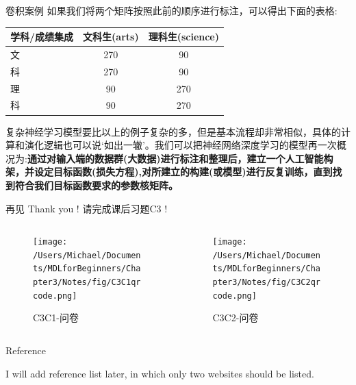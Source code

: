 \documentclass[handout]{beamer}
\begin{document}
\begin{frame}{卷积案例}
如果我们将两个矩阵按照此前的顺序进行标注，可以得出下面的表格:
\begin{table}[H]
\renewcommand{\arraystretch}{1.2}
	\centering
	\begin{tabular}{|l|cc|}
	\hline 
		学科/成绩集成 & 文科生(arts) & 理科生(science) \\
		\hline 
		文& 270 & 90 \\
		科& 270 & 90 \\
		\hline 
		理& 90 & 270 \\
		科& 90 & 270 \\
		\hline 
	\end{tabular}
\end{table}
{\footnotesize
复杂神经学习模型要比以上的例子复杂的多，但是基本流程却非常相似，具体的计算和演化逻辑也可以说`如出一辙'。我们可以把神经网络深度学习的模型再一次概况为:\textbf{通过对输入端的数据群(大数据)进行标注和整理后，建立一个人工智能构架，并设定目标函数(损失方程),对所建立的构建(或模型)进行反复训练，直到找到符合我们目标函数要求的参数核矩阵。}
}
\end{frame}


\begin{frame}{再见}
	Thank you !  请完成课后习题C3 !
\begin{columns}
	\begin{column}{0.4\textwidth}
			\begin{figure}[H]
				\centering
			\texttt{[image: /Users/Michael/Documents/MDLforBeginners/Chapter3/Notes/fig/C3C1qrcode.png]}
			\caption{C3C1-问卷}
			\end{figure}
	\end{column}
	\begin{column}{0.4\textwidth}
		\begin{figure}[H]
	\texttt{[image: /Users/Michael/Documents/MDLforBeginners/Chapter3/Notes/fig/C3C2qrcode.png]}
	\caption{C3C2-问卷}
\end{figure}	
	\end{column}
\end{columns}
\end{frame}




\begin{frame}[allowframebreaks]{Reference}
  
  
  I will add reference list later, in which only two websites should be listed. 
\end{frame}
\end{document}
